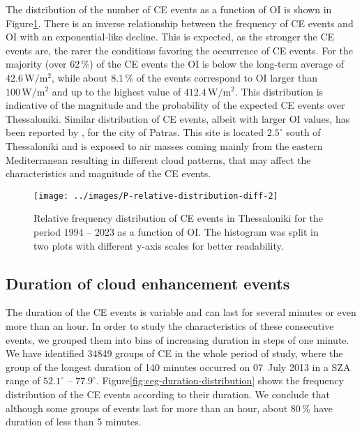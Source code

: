 \documentclass[preprint, 5p,
authoryear]{elsarticle} %
\begin{document}
The distribution of the number of CE events as a function of OI is shown
in Figure\nobreakspace{}\ref{fig:ovir-distribution}. There is an inverse
relationship between the frequency of CE events and OI with an
exponential-like decline. This is expected, as the stronger the CE
events are, the rarer the conditions favoring the occurrence of CE
events. For the majority (over \(62\,\%\)) of the CE events the OI is
below the long-term average of \(42.6\,\text{W}/\text{m}^2\), while
about \(8.1\,\%\) of the events correspond to OI larger than
\(100\,\text{W}/\text{m}^2\) and up to the highest value of
\(412.4\,\text{W}/\text{m}^2\). This distribution is indicative of the
magnitude and the probability of the expected CE events over
Thessaloniki. Similar distribution of CE events, albeit with larger OI
values, has been reported by \citet{Vamvakas2020}, for the city of
Patras. This site is located \(2.5^\circ\) south of Thessaloniki and is
exposed to air masses coming mainly from the eastern Mediterranean
resulting in different cloud patterns, that may affect the
characteristics and magnitude of the CE events.

\begin{figure}

{\centering \texttt{[image: ../images/P-relative-distribution-diff-2]} 

}

\caption{Relative frequency distribution of CE events in Thessaloniki for the period 1994 -- 2023 as a function of OI. The histogram was split in two plots with different y-axis scales for better readability.}\label{fig:ovir-distribution}
\end{figure}

\hypertarget{duration-of-cloud-enhancement-events}{%
\subsection{Duration of cloud enhancement
events}\label{duration-of-cloud-enhancement-events}}

The duration of the CE events is variable and can last for several
minutes or even more than an hour. In order to study the characteristics
of these consecutive events, we grouped them into bins of increasing
duration in steps of one minute. We have identified 34849 groups of CE
in the whole period of study, where the group of the longest duration of
140 minutes occurred on 07~July 2013 in a SZA range of \(52.1^\circ\) --
\(77.9^\circ\). Figure\nobreakspace{}\ref{fig:ceg-duration-distribution}
shows the frequency distribution of the CE events according to their
duration. We conclude that although some groups of events last for more
than an hour, about \(80\,\%\) have duration of less than 5 minutes.
\end{document}
